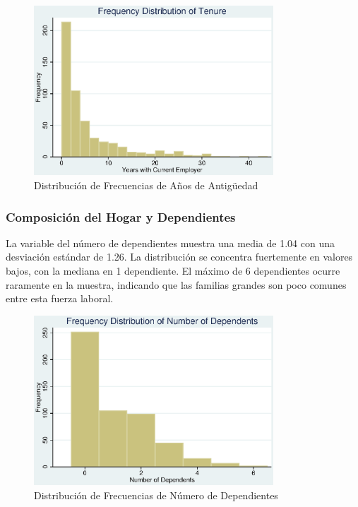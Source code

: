 \documentclass[12pt]{article}
\begin{document}
\begin{figure}[h!]
\centering
\includegraphics[width=0.8\textwidth]{Figures/0201-hist_tenr.eps}
\caption{Distribución de Frecuencias de Años de Antigüedad}
\label{fig:hist_tenure}
\end{figure}

\subsubsection*{Composición del Hogar y Dependientes}

La variable del número de dependientes muestra una media de 1.04 con una desviación estándar de 1.26. La distribución se concentra fuertemente en valores bajos, con la mediana en 1 dependiente. El máximo de 6 dependientes ocurre raramente en la muestra, indicando que las familias grandes son poco comunes entre esta fuerza laboral.

\begin{figure}[h!]
\centering
\includegraphics[width=0.8\textwidth]{Figures/0201-hist_numd.eps}
\caption{Distribución de Frecuencias de Número de Dependientes}
\label{fig:hist_numdep}
\end{figure}
\end{document}
